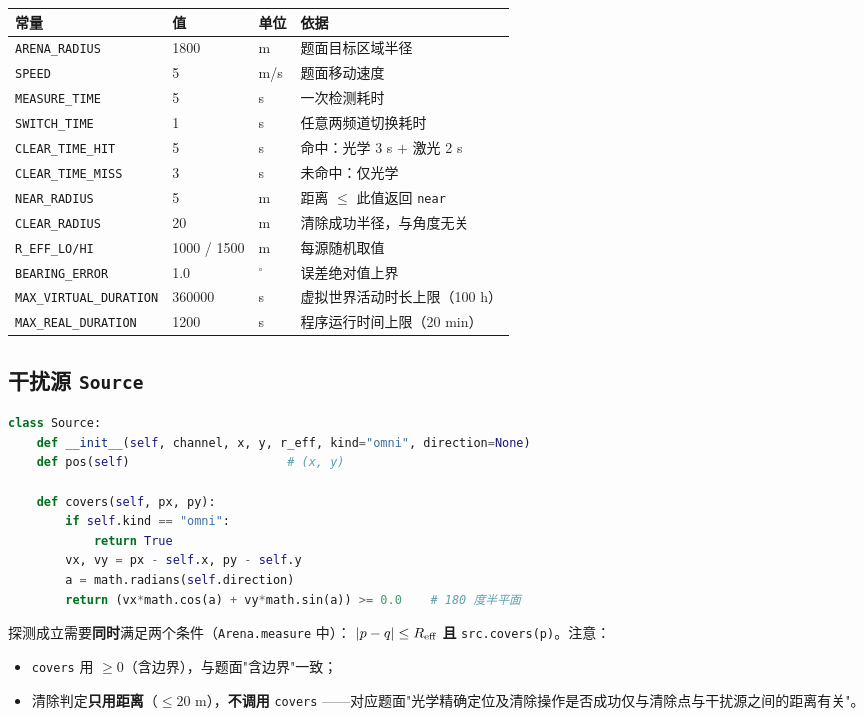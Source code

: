 \begin{center}
\begin{tabular}{lllp{6.4cm}}
\toprule
常量 & 值 & 单位 & 依据 \\ \midrule
\texttt{ARENA\_RADIUS} & 1800 & m & 题面目标区域半径 \\
\texttt{SPEED} & 5 & m/s & 题面移动速度 \\
\texttt{MEASURE\_TIME} & 5 & s & 一次检测耗时 \\
\texttt{SWITCH\_TIME} & 1 & s & 任意两频道切换耗时 \\
\texttt{CLEAR\_TIME\_HIT} & 5 & s & 命中：光学 3 s $+$ 激光 2 s \\
\texttt{CLEAR\_TIME\_MISS} & 3 & s & 未命中：仅光学 \\
\texttt{NEAR\_RADIUS} & 5 & m & 距离 $\le$ 此值返回 \texttt{near} \\
\texttt{CLEAR\_RADIUS} & 20 & m & 清除成功半径，与角度无关 \\
\texttt{R\_EFF\_LO/HI} & 1000 / 1500 & m & 每源随机取值 \\
\texttt{BEARING\_ERROR} & 1.0 & $^{\circ}$ & 误差绝对值上界 \\
\texttt{MAX\_VIRTUAL\_DURATION} & 360000 & s & 虚拟世界活动时长上限（100 h） \\
\texttt{MAX\_REAL\_DURATION} & 1200 & s & 程序运行时间上限（20 min） \\
\bottomrule
\end{tabular}
\end{center}

\subsection{干扰源 \texttt{Source}}

\begin{lstlisting}[language=Python,caption={干扰源的两种覆盖判据}]
class Source:
    def __init__(self, channel, x, y, r_eff, kind="omni", direction=None)
    def pos(self)                      # (x, y)

    def covers(self, px, py):
        if self.kind == "omni":
            return True
        vx, vy = px - self.x, py - self.y
        a = math.radians(self.direction)
        return (vx*math.cos(a) + vy*math.sin(a)) >= 0.0    # 180 度半平面
\end{lstlisting}

探测成立需要\textbf{同时}满足两个条件（\texttt{Arena.measure} 中）：
$|p-q|\le R_{\rm eff}$ \textbf{且} \texttt{src.covers(p)}。注意：
\begin{itemize}[leftmargin=1.8em]
  \item \texttt{covers} 用 $\ge0$（含边界），与题面"含边界"一致；
  \item 清除判定\textbf{只用距离}（$\le20$ m），\textbf{不调用} \texttt{covers}
        ——对应题面"光学精确定位及清除操作是否成功仅与清除点与干扰源之间的距离有关"。
\end{itemize}

